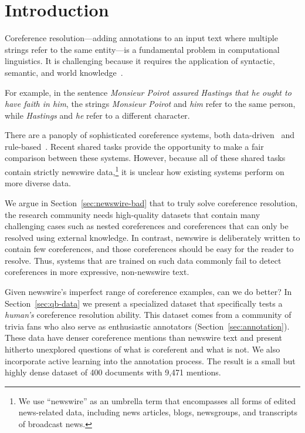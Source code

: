
\section{Introduction}
\label{sec:intro}


Coreference resolution---adding annotations to an input text where multiple
strings refer to the same entity---is a fundamental problem in computational
linguistics. It is challenging because it requires the application of syntactic,
semantic, and world knowledge~\cite{ng2010supervised}.

For example, in the sentence \emph{Monsieur Poirot assured Hastings that he
  ought to have faith in him}, the strings \emph{Monsieur Poirot} and \emph{him}
refer to the same person, while \emph{Hastings} and \emph{he} refer to a
different character.

There are a panoply of sophisticated coreference systems, both
data-driven~\cite{fernandes2012latent,DurrettKlein2013,durrett2014joint,bjorkelund2014learning}
and
rule-based~\cite{Pradhan:2011:CST:2132936.2132937,lee2011stanford}. Recent
\conll{} shared tasks provide the opportunity to make a fair
comparison between these systems. However, because all of these shared
tasks contain strictly newswire data,\footnote{We use ``newswire'' as
  an umbrella term that encompasses all forms of edited news-related data,
  including news articles, blogs, newsgroups, and transcripts of
  broadcast news.} it is unclear how existing systems
perform on more diverse data.

We argue in Section~\ref{sec:newswire-bad} that to truly solve coreference
resolution, the research community needs high-quality datasets that contain many
challenging cases such as nested coreferences and coreferences that can only be
resolved using external knowledge. In contrast, newswire is deliberately
written to contain few coreferences, and those coreferences should be easy for
the reader to resolve. Thus, systems that are trained on such data
commonly fail to detect coreferences in more expressive, non-newswire text.

Given newswire's imperfect range of coreference examples, can we do
better?  In Section~\ref{sec:qb-data} we present a specialized dataset
that specifically tests a \emph{human's} coreference resolution
ability.  This dataset comes from a community of trivia fans who also
serve as enthusiastic annotators (Section~\ref{sec:annotation}). These
data have denser coreference mentions than newswire text and present
hitherto unexplored questions of what is coreferent and what is
not. We also incorporate active learning into the annotation
process. The result is a small but highly dense dataset of 400
documents with 9,471 mentions.

